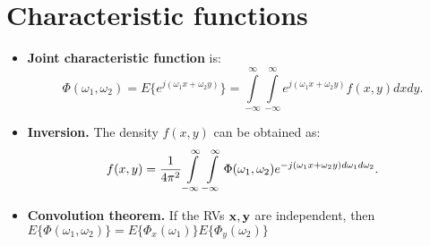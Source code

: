 \documentclass[a4paper, oneside]{book}
\begin{document}
\section{Characteristic functions}
\begin{itemize}
\item \textbf{Joint characteristic function } is:%
$$\Phi(\omega_1,\omega_2) = E\{e^{j(\omega_1 x + \omega_2 y)}\} =  \int\limits_{-\infty}^{\infty} \int\limits_{-\infty}^{\infty} e^{j(\omega_1 x + \omega_2 y)} f(x,y) dx dy.$$ 
\item \textbf{Inversion.} The density $f(x,y)$ can be obtained as: %
$$f(x,y) = \frac{1}{4\pi^2}\int\limits_{-\infty}^\infty \int\limits_{-\infty}^\infty \Phi(\omega_1,\omega_2) e^{-j(\omega_1 x + \omega_2 y)d\omega_1 d\omega_2}. $$
\item \textbf{Convolution theorem.} If the RVs $\mathbf{x,y}$ are independent, then $E\{\Phi(\omega_1, \omega_2)\} = E\{\Phi_x(\omega_1)\}E\{\Phi_y(\omega_2)\}$
\end{itemize}
\end{document}
